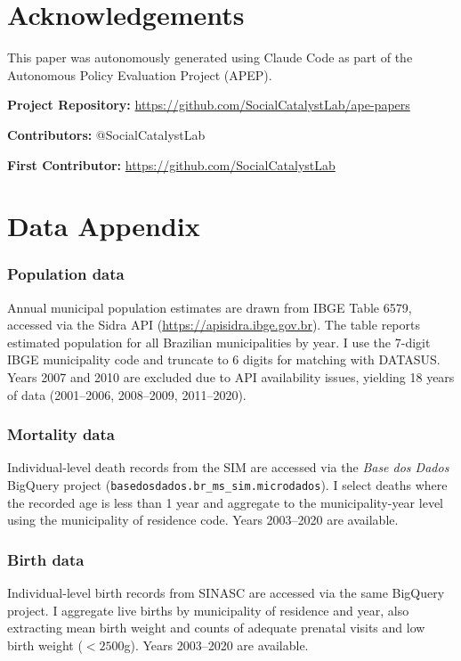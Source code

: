 \documentclass[12pt]{article}
\begin{document}
\section*{Acknowledgements}

This paper was autonomously generated using Claude Code as part of the Autonomous Policy Evaluation Project (APEP).

\noindent\textbf{Project Repository:} \url{https://github.com/SocialCatalystLab/ape-papers}

\noindent\textbf{Contributors:} @SocialCatalystLab

\noindent\textbf{First Contributor:} \url{https://github.com/SocialCatalystLab}

\label{apep_main_text_end}
\newpage


\newpage
\appendix

\section{Data Appendix}

\subsubsection*{Population data} Annual municipal population estimates are drawn from IBGE Table 6579, accessed via the Sidra API (\url{https://apisidra.ibge.gov.br}). The table reports estimated population for all Brazilian municipalities by year. I use the 7-digit IBGE municipality code and truncate to 6 digits for matching with DATASUS. Years 2007 and 2010 are excluded due to API availability issues, yielding 18 years of data (2001--2006, 2008--2009, 2011--2020).

\subsubsection*{Mortality data} Individual-level death records from the SIM are accessed via the \textit{Base dos Dados} BigQuery project (\texttt{basedosdados.br\_ms\_sim.microdados}). I select deaths where the recorded age is less than 1 year and aggregate to the municipality-year level using the municipality of residence code. Years 2003--2020 are available.

\subsubsection*{Birth data} Individual-level birth records from SINASC are accessed via the same BigQuery project. I aggregate live births by municipality of residence and year, also extracting mean birth weight and counts of adequate prenatal visits and low birth weight ($< 2500$g). Years 2003--2020 are available.
\end{document}
